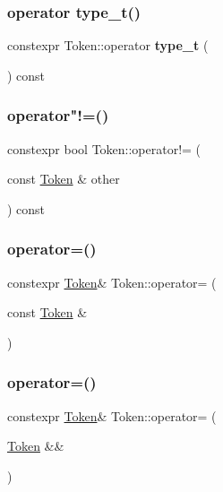 \subsubsection{\texorpdfstring{operator type\+\_\+t()}{operator type\_t()}}
{\footnotesize\ttfamily constexpr Token\+::operator \textbf{ type\+\_\+t} (\begin{DoxyParamCaption}{ }\end{DoxyParamCaption}) const\hspace{0.3cm}{\ttfamily [inline]}}

\mbox{\label{class_token_a0d5bdba8b67c466181c0dbc1565ac743}} 
\subsubsection{\texorpdfstring{operator"!=()}{operator!=()}}
{\footnotesize\ttfamily constexpr bool Token\+::operator!= (\begin{DoxyParamCaption}\item[{const \hyperlink{class_token}{Token} \&}]{other }\end{DoxyParamCaption}) const\hspace{0.3cm}{\ttfamily [inline]}}

\mbox{\label{class_token_af5948f6aab6e746efaae099c750f348f}} 
\subsubsection{\texorpdfstring{operator=()}{operator=()}\hspace{0.1cm}{\footnotesize\ttfamily [1/2]}}
{\footnotesize\ttfamily constexpr \hyperlink{class_token}{Token}\& Token\+::operator= (\begin{DoxyParamCaption}\item[{const \hyperlink{class_token}{Token} \&}]{ }\end{DoxyParamCaption})\hspace{0.3cm}{\ttfamily [default]}}

\mbox{\label{class_token_a7fb2d2c0d997137887d41037f47a39ac}} 
\subsubsection{\texorpdfstring{operator=()}{operator=()}\hspace{0.1cm}{\footnotesize\ttfamily [2/2]}}
{\footnotesize\ttfamily constexpr \hyperlink{class_token}{Token}\& Token\+::operator= (\begin{DoxyParamCaption}\item[{\hyperlink{class_token}{Token} \&\&}]{ }\end{DoxyParamCaption})\hspace{0.3cm}{\ttfamily [default]}}

